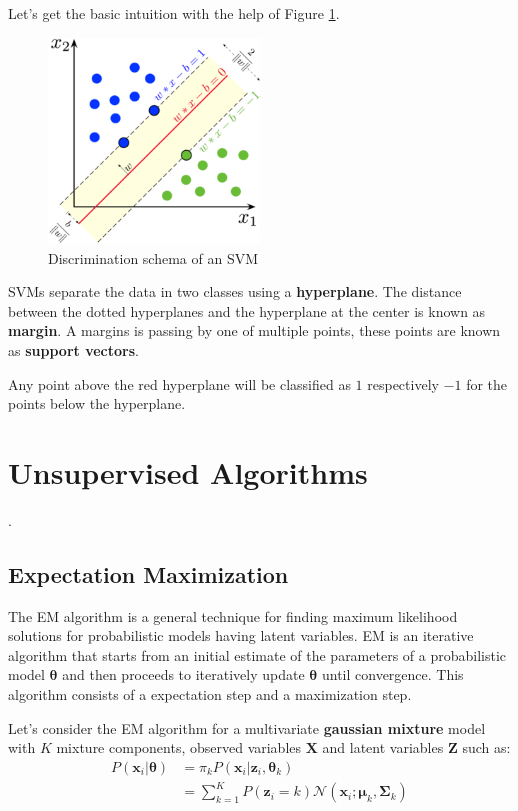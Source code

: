 \documentclass[12pt]{report}
\begin{document}
            Let's get the basic intuition with the help of Figure \ref{fig:svm}.
            \begin{figure}[ht]
                \centering
                \includegraphics[width=0.5\textwidth]{300px-SVM_margin.png}
                \caption{Discrimination schema of an SVM}
                \label{fig:svm}
            \end{figure}
            SVMs separate the data in two classes using a \textbf{hyperplane}. The distance between the dotted hyperplanes and the hyperplane at the center is known as \textbf{margin}.
            A margins is passing by one of multiple points, these points are known as \textbf{support vectors}.
            
            Any point above the red hyperplane will be classified as $1$ respectively $-1$ for the points below the hyperplane.
        
    \section{Unsupervised Algorithms}. 
        \subsection{Expectation Maximization}
            The EM algorithm is a general technique for finding maximum likelihood solutions for probabilistic models having latent variables. EM is an iterative algorithm that starts from an initial estimate of the parameters of a probabilistic model $\boldsymbol{\theta}$ and then proceeds to iteratively update $\boldsymbol{\theta}$ until convergence. This algorithm consists of a expectation step and a maximization step.
            
            Let's consider the EM algorithm for a multivariate \textbf{gaussian mixture} model with $K$ mixture components, observed variables $\boldsymbol{X}$ and latent variables $\boldsymbol{Z}$ such as:
            \begin{align}
                P(\boldsymbol{x}_i | \boldsymbol{\theta}) &= \pi_k P(\boldsymbol{x}_i | \boldsymbol{z}_i, \boldsymbol{\theta}_k)\\
                &= \sum_{k=1}^{K} P(\boldsymbol{z}_i = k) \mathcal{N}(\boldsymbol{x}_i; \boldsymbol{\mu}_k, \boldsymbol{\Sigma}_k)
            \end{align}
            
\end{document}
